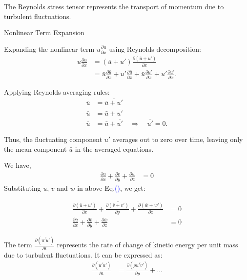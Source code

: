 \documentclass[fleqn,10pt]{SelfArx} %
\newcommand{\myeqref}[1]{Eq.\textcolor{blue}{\textup{(\getrefnumber{#1})}}}
\begin{document}
The Reynolds stress tensor represents the transport of momentum due to turbulent fluctuations.

Nonlinear Term Expansion

Expanding the nonlinear term $u \frac{\partial u}{\partial x}$ using Reynolds decomposition:
\begin{align*}
	u \frac{\partial u}{\partial x} & = (\bar{u}+u') \frac{\partial(\bar{u}+u')}{\partial x}                                                                                                              \\
	                                & = \bar{u} \frac{\partial \bar{u}}{\partial x}+ u' \frac{\partial \bar{u}}{\partial x} + \bar{u} \frac{\partial u'}{\partial x} + u' \frac{\partial u'}{\partial x}.
\end{align*}

Applying Reynolds averaging rules:
\begin{align*}
	\overline{u} & = \overline{\bar{u} + u'}                                            \\
	\overline{u} & = \overline{\bar{u}} + \overline{u'}                                 \\
	\overline{u} & = \bar{u} + \overline{u'} \quad \Rightarrow \quad \overline{u'} = 0.
\end{align*}

Thus, the fluctuating component $u'$ averages out to zero over time, leaving only the mean component $\bar{u}$ in the averaged equations.

We have,
\begin{align}
	\frac{\partial u}{\partial x} + \frac{\partial v}{\partial y} + \frac{\partial w}{\partial z} & =0 \tag{3.4} \label{eq:velocity}
\end{align}
Substituting $u$, $v$ and $w$ in above \myeqref{eq:velocity}, we get:

\begin{align*}
	\overline{\frac{\partial (\bar{u}+u')}{\partial x} + \frac{\partial (\bar{v}+v')}{\partial y} + \frac{\partial (\bar{w}+w')}{\partial z}} & =0                                     \\
	\frac{\partial \bar{u}}{\partial x} + \frac{\partial \bar{v}}{\partial y} + \frac{\partial \bar{w}}{\partial z}                           & =0 \tag{3.5} \label{eq:velocity_putub}
\end{align*}

The term $\frac{\partial(\overline{u'u'})}{\partial t}$ represents the rate of change of kinetic energy per unit mass due to turbulent fluctuations. It can be expressed as:
\begin{align*}
	\frac{\partial (\overline{u'u'})}{\partial t}
	 & = \frac{\partial \left( \rho \overline{u'v'} \right)}{\partial y} + \ldots
\end{align*}
\end{document}
